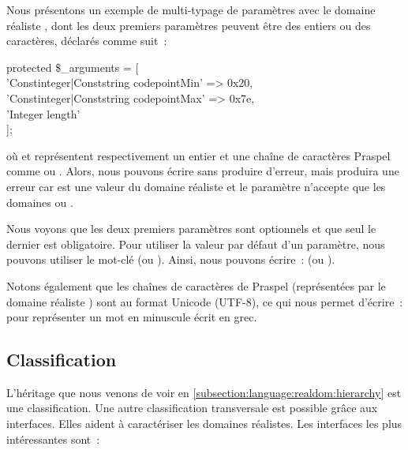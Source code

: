 \begin{example}

Nous présentons un exemple de multi-typage de paramètres avec le domaine
réaliste , dont les deux premiers paramètres peuvent être des
entiers ou des caractères, déclarés comme suit~:
%
\begin{pre}
protected \$_arguments = [ \\
    'Constinteger|Conststring codepointMin' => 0x20, \\
    'Constinteger|Conststring codepointMax' => 0x7e, \\
    'Integer                  length' \\
];
\end{pre}
%
où  et  représentent respectivement un
entier et une chaîne de caractères Praspel comme  ou .
Alors, nous pouvons écrire  sans produire
d'erreur, mais  produira une erreur car
 est une valeur du domaine réaliste  et le
paramètre  n'accepte que les domaines  ou
.

Nous voyons que les deux premiers paramètres sont optionnels et que seul le
dernier est obligatoire. Pour utiliser la valeur par défaut d'un paramètre, nous
pouvons utiliser le mot-clé  (ou ). Ainsi, nous pouvons
écrire~:  (ou ).

Notons également que les chaînes de caractères de Praspel (représentées par le
domaine réaliste ) sont au format Unicode (UTF-8), ce qui nous
permet d'écrire~:  pour représenter
un mot en minuscule écrit en grec.

\end{example}

\subsection{Classification}
\label{subsection:language:realdom:classification}

L'héritage que nous venons de voir en
\ref{subsection:language:realdom:hierarchy} est une classification. Une autre
classification {\strong transversale} est possible grâce aux interfaces. Elles
aident à caractériser les domaines réalistes. Les interfaces les plus
intéressantes sont~:

